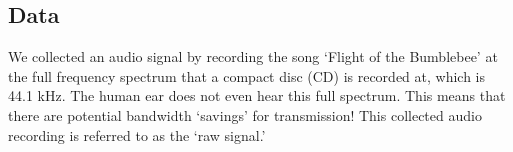 \subsection{Data}
We collected an audio signal by recording the song `Flight of the Bumblebee' at the full frequency spectrum that a compact disc (CD) is recorded at, which is 44.1 kHz. The human ear does not even hear this full spectrum.  This means that there are potential bandwidth `savings' for transmission! This collected audio recording is referred to as the `raw signal.'
